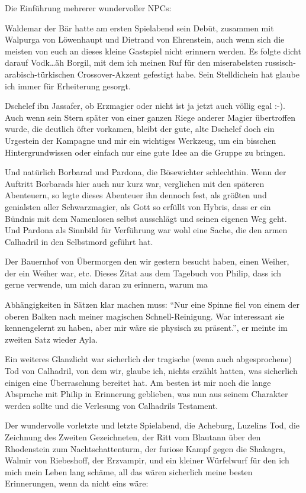 Die Einführung mehrerer wundervoller NPCs:

Waldemar der Bär hatte am ersten Spielabend sein Debüt, zusammen mit Walpurga von Löwenhaupt und Dietrand von Ehrenstein, auch wenn sich die meisten von euch an dieses kleine Gastspiel nicht erinnern werden. Es folgte dicht darauf Vodk\dots äh Borgil, mit dem ich meinen Ruf für den miserabelsten russisch-arabisch-türkischen Crossover-Akzent gefestigt habe. Sein Stelldichein hat glaube ich immer für Erheiterung gesorgt.

Dschelef ibn Jassafer, ob Erzmagier oder nicht ist ja jetzt auch völlig egal :-). Auch wenn sein Stern später von einer ganzen Riege anderer Magier übertroffen wurde, die deutlich öfter vorkamen, bleibt der gute, alte Dschelef doch ein Urgestein der Kampagne und mir ein wichtiges Werkzeug, um ein bisschen Hintergrundwissen oder einfach nur eine gute Idee an die Gruppe zu bringen.

Und natürlich Borbarad und Pardona, die Bösewichter schlechthin. Wenn der Auftritt Borbarads hier auch nur kurz war, verglichen mit den späteren Abenteuern, so legte dieses Abenteuer ihn dennoch fest, als größten und genialsten aller Schwarzmagier, als Gott so erfüllt von Hybris, dass er ein Bündnis mit dem Namenlosen selbst ausschlägt und seinen eigenen Weg geht. Und Pardona als Sinnbild für Verführung war wohl eine Sache, die den armen Calhadril in den Selbstmord geführt hat.

Der Bauernhof von Übermorgen den wir gestern besucht haben, einen Weiher, der ein Weiher war, etc.
Dieses Zitat aus dem Tagebuch von Philip, dass ich gerne verwende, um mich daran zu erinnern, warum ma\par Abhängigkeiten in Sätzen klar machen muss: ``Nur eine Spinne fiel von einem der oberen Balken nach meiner magischen Schnell-Reinigung. War interessant sie kennengelernt zu haben, aber mir wäre sie physisch zu präsent.'', er meinte im zweiten Satz wieder Ayla.

Ein weiteres Glanzlicht war sicherlich der tragische (wenn auch abgesprochene) Tod von Calhadril, von dem wir, glaube ich, nichts erzählt hatten, was sicherlich einigen eine Überraschung bereitet hat. Am besten ist mir noch die lange Absprache mit Philip in Erinnerung geblieben, was nun aus seinem Charakter werden sollte und die Verlesung von Calhadrils Testament.

Der wundervolle vorletzte und letzte Spielabend, die Acheburg, Luzelins Tod, die Zeichnung des Zweiten Gezeichneten, der Ritt vom Blautann über den Rhodenstein zum Nachtschattenturm, der furiose Kampf gegen die Shakagra, Walmir von Riebeshoff, der Erzvampir, und ein kleiner Würfelwurf für den ich mich mein Leben lang schäme, all das wären sicherlich meine besten Erinnerungen, wenn da nicht eins wäre:\par\bigskip

